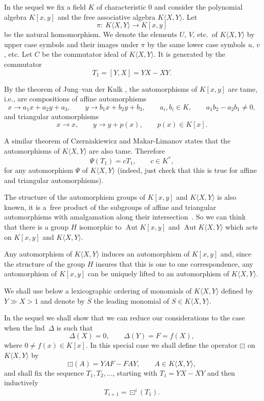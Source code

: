 \documentclass[10pt,a4paper]{amsart}
\numberwithin{equation}{section}
\begin{document}
In the sequel we fix a field $K$ of characteristic 0 and consider the polynomial algebra $K[x,y]$ and the free associative algebra $K\langle X,Y\rangle$. Let
\[
\pi\colon \ K\langle X,Y\rangle\to K[x,y]
\]
be the natural homomorphism. We denote the elements $U$, $V$, etc.\ of $K\langle X,Y\rangle$ by upper case symbols and their images under $\pi$ by the same lower case symbols $u$, $v$, etc. Let $C$ be the commutator ideal of $K\langle X,Y\rangle$. It is generated by the commutator
\[
T_1 = [Y, X] = YX - XY.
\]

By the theorem of Jung--van der Kulk \cite{J, K}, the automorphisms of $K[x,y]$ are tame, i.e., are compositions of affine automorphisms
\[
x \rightarrow a_1 x + a_2 y + a_3, \qquad y \rightarrow b_1 x + b_2 y + b_3, \qquad a_i,b_i\in K,\qquad a_1b_2 - a_2b_1 \neq 0,
\]
and triangular automorphisms
\[
x \rightarrow x, \qquad y \rightarrow y + p(x),\qquad p(x)\in K[x].
\]

A similar theorem of Czerniakiewicz \cite{Cz1, Cz2} and Makar-Limanov \cite{ML} states that the automorphisms of $K\langle X,Y\rangle$ are also tame. Therefore
\[
\Psi(T_1) = cT_1, \qquad c \in K^{\ast},
\]
for any automorphism $\Psi$ of $K\langle X,Y\rangle$ (indeed, just check that this is true for affine and triangular automorphisms).

The structure of the automorphism groups of $K[x, y]$ and $K\langle X,Y\rangle$ is also known, it is a~free product of the subgroups of affine and triangular automorphisms with amalgamation along their intersection~\cite{Se}. So we can think that there is a group $H$ isomorphic to $\operatorname{Aut}K[x,y]$ and $\operatorname{Aut}K\langle X,Y\rangle$ which acts on $K[x, y]$ and $K\langle X,Y\rangle$.

Any automorphism of $K\langle X,Y\rangle$ induces an automorphism of $K[x, y]$ and, since the structure of the group $H$ insures that this is one to one correspondence, any automorphism of $K[x,y]$ can be uniquely lifted to an automorphism of $K\langle X,Y\rangle$.

We shall use below a lexicographic ordering of monomials of $K\langle X,Y\rangle$ defined by $Y\gg X > 1$ and denote by $\overline{S}$ the leading monomial of $S \in K\langle X,Y\rangle$.

In the sequel we shall show that we can reduce our considerations to the case when the lnd~$\Delta$ is such that
\[
\Delta(X)=0,\qquad \Delta(Y)=F=f(X),
\]
where $0\not=f(x)\in K[x]$. In this special case we shall define the operator $\boxdot$ on $K\langle X,Y\rangle$ by
\[
\boxdot(A)= YAF - FAY,\qquad A\in K\langle X,Y\rangle,
\]
and shall fix the sequence $T_1,T_2,\ldots$, starting with $T_1= YX - XY$ and then inductively
\[
T_{i+1} = \boxdot^i(T_1).
\]
\end{document}
